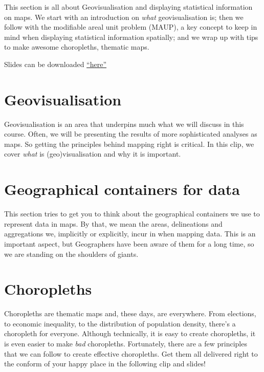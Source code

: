 \documentclass[
  letterpaper,
  DIV=11,
  numbers=noendperiod]{scrreprt}
\begin{document}
This section is all about Geovisualisation and displaying statistical
information on maps. We start with an introduction on \emph{what}
geovisualisation is; then we follow with the modifiable areal unit
problem (MAUP), a key concept to keep in mind when displaying
statistical information spatially; and we wrap up with tips to make
awesome choropleths, thematic maps.

Slides can be downloaded \href{./html/vector_data_gds.pdf}{``here''}

\section*{Geovisualisation}\label{geovisualisation}


Geovisualisation is an area that underpins much what we will discuss in
this course. Often, we will be presenting the results of more
sophisticated analyses as maps. So getting the principles behind mapping
right is critical. In this clip, we cover \emph{what} is
(geo)visualisation and why it is important.

\section*{Geographical containers for
data}\label{geographical-containers-for-data}


This section tries to get you to think about the geographical containers
we use to represent data in maps. By that, we mean the areas,
delineations and aggregations we, implicitly or explicitly, incur in
when mapping data. This is an important aspect, but Geographers have
been aware of them for a long time, so we are standing on the shoulders
of giants.

\section*{Choropleths}\label{choropleths}


Choropleths are thematic maps and, these days, are everywhere. From
elections, to economic inequality, to the distribution of population
density, there's a choropleth for everyone. Although technically, it is
easy to create choropleths, it is even easier to make \emph{bad}
choropleths. Fortunately, there are a few principles that we can follow
to create effective choropleths. Get them all delivered right to the
conform of your happy place in the following clip and slides!
\end{document}
